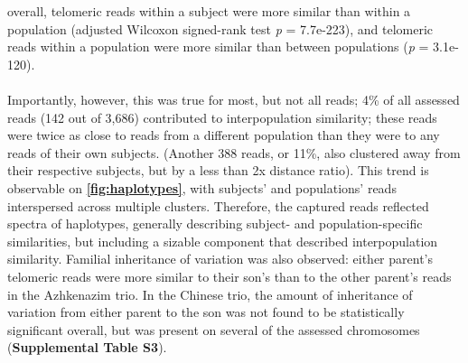 \documentclass{article}
\begin{document}
        overall,
            telomeric reads within a subject were more similar than within a population
                (adjusted Wilcoxon signed-rank test \textit{p} = 7.7e-223),
            and telomeric reads within a population were more similar than between populations
                (\textit{p} = 3.1e-120).
        ~\\
        
        ~\\
        Importantly, however, this was true for most, but not all reads;
            4\% of all assessed reads (142 out of 3,686) contributed to interpopulation similarity;
                these reads were twice as close to reads from a different population than they were to any reads of their own subjects.
            (Another 388 reads, or 11\%, also clustered away from their respective subjects, but by a less than 2x distance ratio).
            This trend is observable on \textbf{\autoref{fig:haplotypes}},
                with subjects' and populations' reads interspersed across multiple clusters.
        Therefore, the captured reads reflected spectra of haplotypes,
            generally describing subject- and population-specific similarities,
            but including a sizable component that described interpopulation similarity.
        Familial inheritance of variation was also observed:
            either parent's telomeric reads were more similar to their son's than to the other parent's reads in the Azhkenazim trio.
            In the Chinese trio,
                the amount of inheritance of variation from either parent to the son was not found to be statistically significant overall,
                but was present on several of the assessed chromosomes (\textbf{Supplemental Table S3}).
\end{document}
